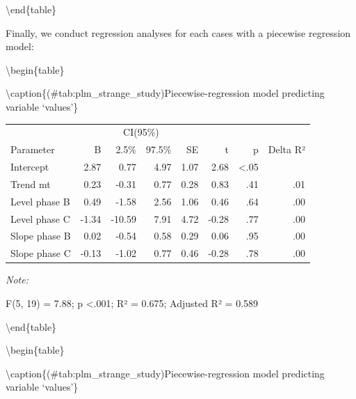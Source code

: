 \documentclass[
]{book}
\newenvironment{Shaded}{\begin{snugshade}}{\end{snugshade}}
\newcommand{\FunctionTok}[1]{\textcolor[rgb]{0.00,0.00,0.00}{#1}}
\newcommand{\NormalTok}[1]{#1}
\newcommand{\SpecialCharTok}[1]{\textcolor[rgb]{0.00,0.00,0.00}{#1}}
\begin{document}
\textbackslash end\{table\}

Finally, we conduct regression analyses for each cases with a piecewise regression model:

\begin{Shaded}
\end{Shaded}

\textbackslash begin\{table\}

\textbackslash caption\{(\#tab:plm\_strange\_study)Piecewise-regression model predicting variable `values'\}
\centering

\begin{threeparttable}
\begin{tabular}[t]{lrrrrrrr}
\toprule
\multicolumn{2}{c}{ } & \multicolumn{2}{c}{CI(95\%)} & \multicolumn{4}{c}{ } \\
\cmidrule(l{3pt}r{3pt}){3-4}
Parameter & B & 2.5\% & 97.5\% & SE & t & p & Delta R²\\
\midrule
Intercept & 2.87 & 0.77 & 4.97 & 1.07 & 2.68 & <.05 & \\
Trend mt & 0.23 & -0.31 & 0.77 & 0.28 & 0.83 & .41 & .01\\
Level phase B & 0.49 & -1.58 & 2.56 & 1.06 & 0.46 & .64 & .00\\
Level phase C & -1.34 & -10.59 & 7.91 & 4.72 & -0.28 & .77 & .00\\
Slope phase B & 0.02 & -0.54 & 0.58 & 0.29 & 0.06 & .95 & .00\\
Slope phase C & -0.13 & -1.02 & 0.77 & 0.46 & -0.28 & .78 & .00\\
\bottomrule
\end{tabular}
\begin{tablenotes}
\item \textit{Note: } 
\item F(5, 19) = 7.88; p <.001; R² = 0.675; Adjusted R² = 0.589
\end{tablenotes}
\end{threeparttable}

\textbackslash end\{table\}

\textbackslash begin\{table\}

\textbackslash caption\{(\#tab:plm\_strange\_study)Piecewise-regression model predicting variable `values'\}
\centering
\end{document}
